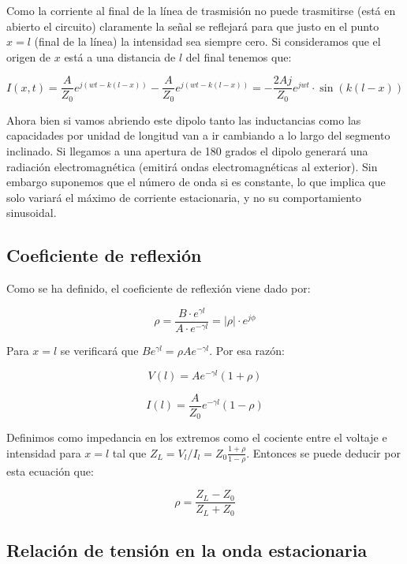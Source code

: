 \documentclass[12pt]{article}
\begin{document}
Como la corriente al final de la línea de trasmisión no puede trasmitirse (está en abierto el circuito) claramente la señal se reflejará para que justo en el punto $x=l$ (final de la línea) la intensidad sea siempre cero. Si consideramos que el origen de $x$ está a una distancia de $l$ del final tenemos que:

\begin{equation}
I (x,t) = \dfrac{A}{Z_0 } e^{j(wt - k(l-x))} - \dfrac{A}{Z_0 } e^{j(wt - k(l-x))} = - \dfrac{2 A j}{Z_0} e^{jwt} \cdot \sin (k(l-x))
\end{equation}

Ahora bien si vamos abriendo este dipolo tanto las inductancias como las capacidades por unidad de longitud van a ir cambiando a lo largo del segmento inclinado. Si llegamos a una apertura de 180 grados el dipolo generará una radiación electromagnética (emitirá ondas electromagnéticas al exterior). Sin embargo suponemos que el número de onda si es constante, lo que implica que solo variará el máximo de corriente estacionaria, y no su comportamiento sinusoidal.


\subsection{Coeficiente de reflexión}

Como se ha definido, el coeficiente de reflexión viene dado por:

$$ \rho = \dfrac{B \cdot e^{\gamma l}}{A \cdot e^{-\gamma l}} = |\rho| \cdot e^{j \phi} $$

Para $x=l$ se verificará que $B e^{\gamma l} = \rho A e^{-\gamma l}$. Por esa razón:

\begin{equation}
V(l) = A e^{-\gamma l} (1+ \rho)
\end{equation}

\begin{equation}
I(l) = \frac{A}{Z_0} e^{-\gamma l} (1-\rho)
\end{equation}

Definimos como impedancia en los extremos como el cociente entre el voltaje e intensidad para $x=l$ tal que $Z_L = V_l / I_l = Z_0 \frac{1+\rho}{1-\rho}$. Entonces se puede deducir por esta ecuación que:

\begin{equation}
\rho = \frac{Z_L - Z_0}{Z_L+Z_0}
\end{equation}

\subsection{Relación de tensión en la onda estacionaria}
\end{document}
